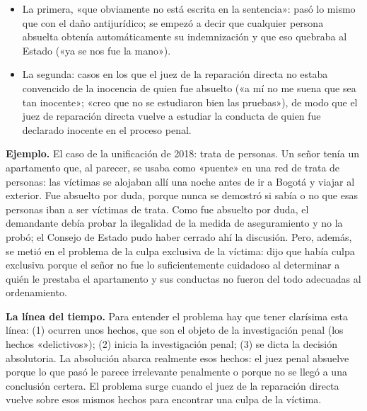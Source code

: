 \begin{itemize}
\item La primera, «que obviamente no está escrita en la sentencia»: pasó lo mismo que con el daño antijurídico; se empezó a decir que cualquier persona absuelta obtenía automáticamente su indemnización y que eso quebraba al Estado («ya se nos fue la mano»).
\item La segunda: casos en los que el juez de la reparación directa no estaba convencido de la inocencia de quien fue absuelto («a mí no me suena que sea tan inocente»; «creo que no se estudiaron bien las pruebas»), de modo que el juez de reparación directa vuelve a estudiar la conducta de quien fue declarado inocente en el proceso penal.
\end{itemize}
\begin{ejemplo}
\textcolor[HTML]{4F6228}{\textbf{Ejemplo. }}El caso de la unificación de 2018: trata de personas. Un señor tenía un apartamento que, al parecer, se usaba como «puente» en una red de trata de personas: las víctimas se alojaban allí una noche antes de ir a Bogotá y viajar al exterior. Fue absuelto por duda, porque nunca se demostró si sabía o no que esas personas iban a ser víctimas de trata. Como fue absuelto por duda, el demandante debía probar la ilegalidad de la medida de aseguramiento y no la probó; el Consejo de Estado pudo haber cerrado ahí la discusión. Pero, además, se metió en el problema de la culpa exclusiva de la víctima: dijo que había culpa exclusiva porque el señor no fue lo suficientemente cuidadoso al determinar a quién le prestaba el apartamento y sus conductas no fueron del todo adecuadas al ordenamiento.
\end{ejemplo}
\textbf{La línea del tiempo.} Para entender el problema hay que tener clarísima esta línea: (1) ocurren unos hechos, que son el objeto de la investigación penal (los hechos «delictivos»); (2) inicia la investigación penal; (3) se dicta la decisión absolutoria. La absolución abarca realmente esos hechos: el juez penal absuelve porque lo que pasó le parece irrelevante penalmente o porque no se llegó a una conclusión certera. El problema surge cuando el juez de la reparación directa vuelve sobre esos mismos hechos para encontrar una culpa de la víctima.

